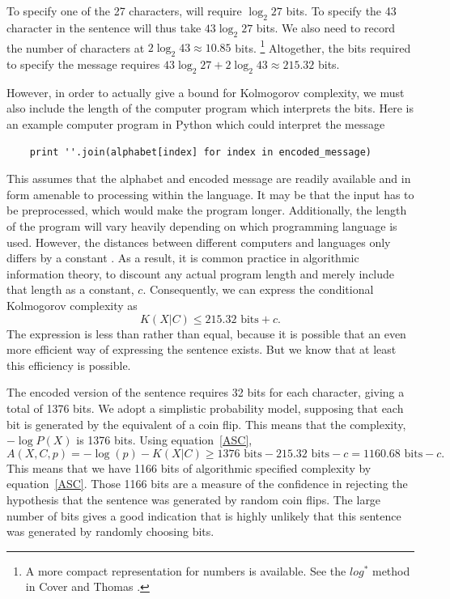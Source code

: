 To specify one of the 27 characters, will require $\log_2 27$ bits. 
To specify the 43 character in the sentence will thus take $43 \log_2 27$ bits.
We also need to record the number of characters at $2 \log_2 43 \approx 10.85$ bits. 
\footnote{A more compact representation for numbers is available. See the $log^*$ method in Cover and Thomas \cite{Cover2006}.}
Altogether, the bits required to specify the message requires $43 \log_2 27 + 2 \log_2 43 \approx 215.32$ bits. 


However, in order to actually give a bound for Kolmogorov complexity, we must also include the length of the computer program which interprets the bits.
Here is an example computer program in Python which could interpret the message
\begin{verbatim}
    print ''.join(alphabet[index] for index in encoded_message)
\end{verbatim}
This assumes that the alphabet and encoded message are readily available and in form amenable to processing within the language.
It may be that the input has to be preprocessed, which would make the program longer.
Additionally, the length of the program will vary heavily depending on which programming language is used.
However, the distances between different computers and languages only differs by a constant \cite{Cover2006}.
As a result, it is common practice in algorithmic information theory, to discount any actual program length and merely include that length 
as a constant, $c$. 
Consequently, we can express the conditional Kolmogorov complexity as 
\begin{equation}
    \label{kc.alpha}
    K(X|C) \leq 215.32 \mbox{ bits} + c \mbox{.}
\end{equation}
The expression is less than rather than equal, because it is possible that an even more efficient way of expressing the sentence exists.
But we know that at least this efficiency is possible.

The encoded version of the sentence requires 32 bits for each character, giving a total of 1376 bits.
We adopt a simplistic probability model, supposing that each bit is generated by the equivalent of a coin flip.
This means that the complexity, $-\log P(X)$ is 1376 bits.
Using equation~\ref{ASC},
\begin{equation}
    A(X,C,p) = -\log(p) - K(X|C) \geq 1376 \mbox{ bits} - 215.32 \mbox{ bits} - c  = 1160.68 \mbox{ bits} - c \mbox{.}
\end{equation}
This means that we have 1166 bits of algorithmic specified complexity by equation~\ref{ASC}.
Those 1166 bits are a measure of the confidence in rejecting the hypothesis that the sentence was generated by random coin flips.
The large number of bits gives a good indication that is highly unlikely that this sentence was generated by randomly choosing bits.

